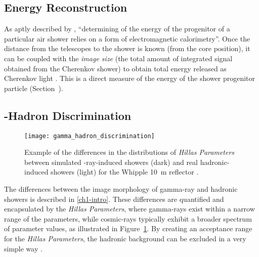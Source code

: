 \subsection{Energy Reconstruction}

As aptly described by \textcite[][p.~16]{Dickinson2010}, ``determining of the energy of the progenitor of a particular air shower relies on a form of electromagnetic calorimetry''. Once the distance from the telescopes to the shower is known (from the core position), it can be coupled with the \textit{image size} (the total amount of integrated signal obtained from the Cherenkov shower) to obtain total energy released as Cherenkov light \cite{Cogan2006,Bernlohr2013a}. This is a direct measure of the energy of the shower progenitor particle (Section~).

\subsection{\textgamma-Hadron Discrimination}

\begin{figure}
	\centering
    \texttt{[image: gamma\_hadron\_discrimination]} 
	\caption[Discriminating between images of gamma-ray and hadron induced showers.]{Example of the differences in the distributions of \textit{Hillas Parameters} between simulated \textgamma-ray-induced showers (dark) and real hadronic-induced showers (light) for the Whipple \SI{10}{m} reflector \cite{Fegan1999a}.}
	\label{fig:gamma_hadron_discrimination}
\end{figure}

The differences between the image morphology of gamma-ray and hadronic showers is described in \ref{ch1-intro}. These differences are quantified and encapsulated by the \textit{Hillas Parameters}, where gamma-rays exist within a narrow range of the parameters, while cosmic-rays typically exhibit a broader spectrum of parameter values, as illustrated in Figure~\ref{fig:gamma_hadron_discrimination}. By creating an acceptance range for the \textit{Hillas Parameters}, the hadronic background can be excluded in a very simple way \cite{Dickinson2010,Fegan1999a,Hillas1996a}.
